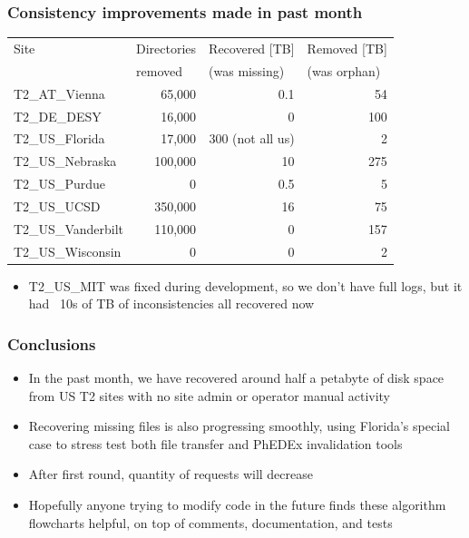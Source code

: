 \documentclass{beamer}
\begin{document}
\begin{frame}
  \frametitle{Consistency improvements made in past month}

  \centering
  {\scriptsize
    \begin{tabular}{l | r | r | r}
      \hline
      Site & \multicolumn{1}{l|}{Directories} & \multicolumn{1}{l|}{Recovered [TB]} & \multicolumn{1}{l}{Removed [TB]} \\
      & \multicolumn{1}{l|}{removed} & \multicolumn{1}{l|}{(was missing)} & \multicolumn{1}{l}{(was orphan)} \\
      \hline
      T2\_AT\_Vienna & 65,000 & 0.1 & 54 \\
      T2\_DE\_DESY & 16,000 & 0 & 100 \\
      T2\_US\_Florida & 17,000 & 300 (not all us) & 2 \\
      T2\_US\_Nebraska & 100,000 & 10 & 275 \\
      \hline
      T2\_US\_Purdue & 0 & 0.5 & 5 \\
      T2\_US\_UCSD & 350,000 & 16 & 75 \\
      T2\_US\_Vanderbilt & 110,000 & 0 & 157 \\
      T2\_US\_Wisconsin & 0 & 0 & 2 \\
      \hline
    \end{tabular}
  }

  \vspace{8pt}
  \begin{itemize}
  \item T2\_US\_MIT was fixed during development, so we don't have full logs,
    but it had ~10s of TB of inconsistencies all recovered now
  \end{itemize}

\end{frame}

\begin{frame}
  \frametitle{Conclusions}

  \begin{itemize}
  \item In the past month, we have recovered around half a petabyte of disk space
    from US T2 sites with no site admin or operator manual activity
  \item Recovering missing files is also progressing smoothly,
    using Florida's special case to stress test both file transfer
    and PhEDEx invalidation tools
  \item After first round, quantity of requests will decrease
  \item Hopefully anyone trying to modify code in the future finds these
    algorithm flowcharts helpful, on top of comments, documentation, and tests
  \end{itemize}

\end{frame}
\end{document}
